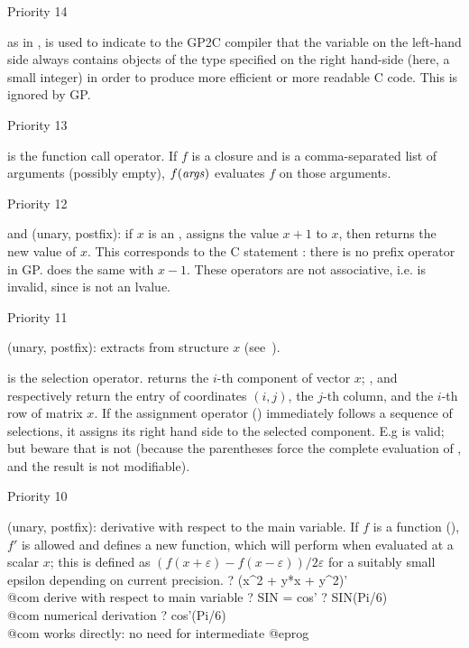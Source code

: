 \def\point#1{\noindent\item #1\hfill\break\indent\strut}
\point{Priority 14}
%
\kbd{:} as in , is used to indicate to the GP2C compiler that the
variable on the left-hand side always contains objects of the type specified
on the right hand-side (here, a small integer) in order to produce more
efficient or more readable C code. This is ignored by GP.

%
\point{Priority 13}
\kbd{( )} is the function call operator. If $f$ is a closure and 
is a comma-separated list of arguments (possibly empty),
$f{\tt (\hbox{\it args\/})}$ evaluates $f$ on those arguments.

\point{Priority 12}
%
\kbd{++} and \kbd{--} (unary, postfix): if $x$ is an ,
 assigns the value $x+1$ to $x$, then returns the new value of
$x$. This corresponds to the C statement : there is no prefix
\kbd{++} operator in GP.  does the same with $x-1$. These
operators are not associative, i.e.  is invalid, since
 is not an lvalue.

\point{Priority 11}
%
 (unary, postfix):  extracts
 from structure $x$ (see~).

\kbd{[ ]} is the selection operator.  returns the $i$-th
component of vector $x$; ,  and
 respectively return the entry of coordinates $(i,j)$, the
$j$-th column, and the $i$-th row of matrix $x$. If the assignment operator
(\kbd{=}) immediately follows a sequence of selections, it assigns its right
hand side to the selected component. E.g  is valid; but
beware that  is not (because the parentheses force the
complete evaluation of , and the result is not modifiable).

\point{Priority 10}
%
 (unary, postfix): derivative with respect to the main variable.
If $f$ is a function (), $f'$ is allowed and defines a new
function, which will perform  when evaluated
at a scalar $x$; this is defined as $(f(x+\varepsilon) - f(x-\varepsilon)) /
2\varepsilon$ for a suitably small epsilon depending on current precision.
\bprog
? (x^2 + y*x + y^2)'  \\@com derive with respect to main variable 
? SIN = cos'
? SIN(Pi/6)         \\@com numerical derivation
? cos'(Pi/6)        \\@com works directly: no need for intermediate 
@eprog


